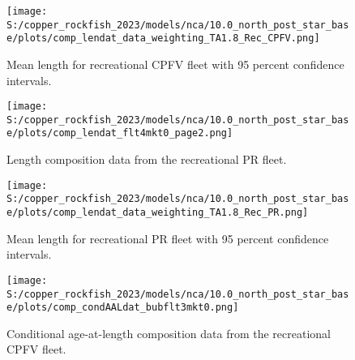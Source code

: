 \documentclass[11pt,
  letterpaper,
]{article}
\begin{document}
\pagebreak

\begin{figure}
{\centering
\texttt{[image: S:/copper\_rockfish\_2023/models/nca/10.0\_north\_post\_star\_base/plots/comp\_lendat\_data\_weighting\_TA1.8\_Rec\_CPFV.png]}
}
\caption{Mean length for recreational CPFV fleet with 95 percent confidence intervals.\label{fig:mean-rec-cpfv-len-data}}
\end{figure}

\pagebreak

\begin{figure}
{\centering
\texttt{[image: S:/copper\_rockfish\_2023/models/nca/10.0\_north\_post\_star\_base/plots/comp\_lendat\_flt4mkt0\_page2.png]}
}
\caption{Length composition data from the recreational PR fleet.\label{fig:rec-pr-len-data}}
\end{figure}

\pagebreak

\begin{figure}
{\centering
\texttt{[image: S:/copper\_rockfish\_2023/models/nca/10.0\_north\_post\_star\_base/plots/comp\_lendat\_data\_weighting\_TA1.8\_Rec\_PR.png]}
}
\caption{Mean length for recreational PR fleet with 95 percent confidence intervals.\label{fig:mean-rec-pr-len-data}}
\end{figure}

\begin{figure}
{\centering
\texttt{[image: S:/copper\_rockfish\_2023/models/nca/10.0\_north\_post\_star\_base/plots/comp\_condAALdat\_bubflt3mkt0.png]}
}
\caption{Conditional age-at-length composition data from the recreational CPFV fleet.\label{fig:rec-cpfv-caal-data}}
\end{figure}

\pagebreak
\end{document}
